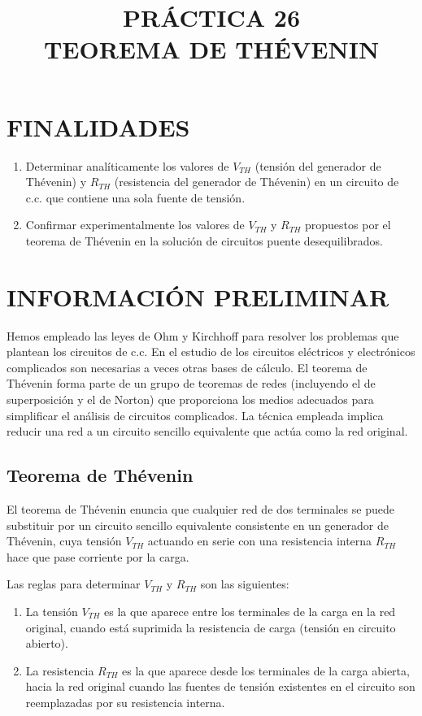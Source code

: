 \documentclass[a4paper,12pt]{article}
\title{\textbf{PRÁCTICA 26 \\ TEOREMA DE THÉVENIN}}
\author{}
\date{}
\begin{document}
\maketitle

\tableofcontents
\newpage

\section{FINALIDADES}
\begin{enumerate}[label=\arabic*.]
    \item Determinar analíticamente los valores de \(V_{TH}\) (tensión del generador de Thévenin) y \(R_{TH}\) (resistencia del generador de Thévenin) en un circuito de c.c. que contiene una sola fuente de tensión.
    \item Confirmar experimentalmente los valores de \(V_{TH}\) y \(R_{TH}\) propuestos por el teorema de Thévenin en la solución de circuitos puente desequilibrados.
\end{enumerate}

\section{INFORMACIÓN PRELIMINAR}
Hemos empleado las leyes de Ohm y Kirchhoff para resolver los problemas que plantean los circuitos de c.c. En el estudio de los circuitos eléctricos y electrónicos complicados son necesarias a veces otras bases de cálculo. El teorema de Thévenin forma parte de un grupo de teoremas de redes (incluyendo el de superposición y el de Norton) que proporciona los medios adecuados para simplificar el análisis de circuitos complicados. La técnica empleada implica reducir una red a un circuito sencillo equivalente que actúa como la red original.

\subsection{Teorema de Thévenin}
El teorema de Thévenin enuncia que cualquier red de dos terminales se puede substituir por un circuito sencillo equivalente consistente en un generador de Thévenin, cuya tensión $V_{TH}$ actuando en serie con una resistencia interna $R_{TH}$ hace que pase corriente por la carga.

Las reglas para determinar \( V_{TH} \) y \( R_{TH} \) son las siguientes:

\begin{enumerate}[label=\arabic*.]
    \item La tensión \( V_{TH} \) es la que aparece entre los terminales de la carga en la red original, cuando está suprimida la resistencia de carga (tensión en circuito abierto).
    \item La resistencia \( R_{TH} \) es la que aparece desde los terminales de la carga abierta, hacia la red original cuando las fuentes de tensión existentes en el circuito son reemplazadas por su resistencia interna.
\end{enumerate}
\end{document}
